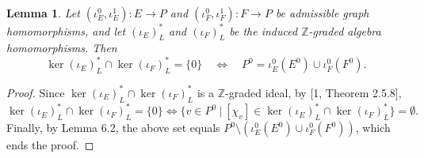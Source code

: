 \documentclass[12pt,times,a4paper]{amsart}
\newtheorem{lemma}[theorem]{Lemma}
\numberwithin{equation}{section}
\numberwithin{equation}{section}
\begin{document}
\begin{lemma}\label{kerint}
Let $(\iota^0_E,\iota^1_E):E\to P$ and $(\iota^0_F,\iota_F^1):F\to P$ be admissible graph homomorphisms, and let 
$(\iota_E)^*_L$ and $(\iota_F)^*_L$ be the induced $\mathbb{Z}$-graded algebra homomorphisms. Then
\begin{equation*}
\ker (\iota_E)^*_L\cap\ker (\iota_F)^*_L=\{0\}\quad\iff\quad P^0=\iota_E^0(E^0)\cup \iota_F^0(F^0).
\end{equation*}
\end{lemma}
\begin{proof}
Since $\ker(\iota_E)^*_L\cap\ker(\iota_F)^*_L$ is a $\mathbb{Z}$-graded ideal, by [1, Theorem 2.5.8], 
\[
\ker(\iota_E)^*_L\cap\ker(\iota_F)^*_L=\{0\}\iff \{v\in P^0~|~[\chi_v]\in \ker(\iota_E)^*_L\cap\ker(\iota_F)^*_L\}=\emptyset.
\]
Finally, by Lemma 6.2, the above set equals $P^0\setminus (\iota_E^0(E^0)\cup\iota_F^0(F^0))$, which ends the proof.
\end{proof}
\end{document}
